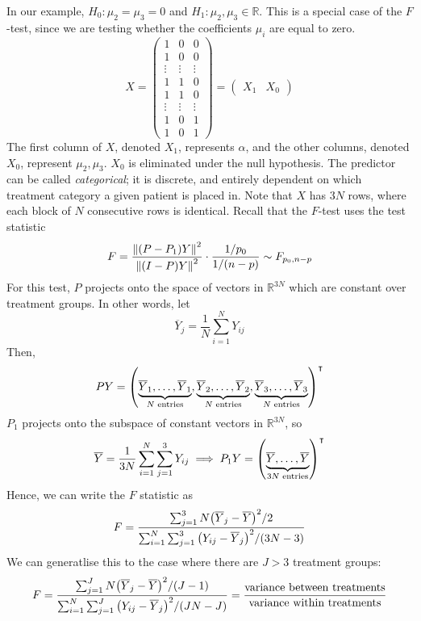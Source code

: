 In our example, \( H_0 \colon \mu_2 = \mu_3 = 0 \) and \( H_1 \colon \mu_2, \mu_3 \in \mathbb R \).
This is a special case of the \( F \)-test, since we are testing whether the coefficients \( \mu_i \) are equal to zero.
\[
	X = \begin{pmatrix}
		1      & 0      & 0      \\
		1      & 0      & 0      \\
		\vdots & \vdots & \vdots \\
		1      & 1      & 0      \\
		1      & 1      & 0      \\
		\vdots & \vdots & \vdots \\
		1      & 0      & 1      \\
		1      & 0      & 1
	\end{pmatrix} = \begin{pmatrix}
		X_1 & X_0
	\end{pmatrix}
\]
The first column of \( X \), denoted \( X_1 \), represents \( \alpha \), and the other columns, denoted \( X_0 \), represent \( \mu_2, \mu_3 \).
\( X_0 \) is eliminated under the null hypothesis.
The predictor can be called \textit{categorical}; it is discrete, and entirely dependent on which treatment category a given patient is placed in.
Note that \( X \) has \( 3N \) rows, where each block of \( N \) consecutive rows is identical.
Recall that the \( F \)-test uses the test statistic
\[
	F = \frac{\norm{(P-P_1)Y}^2}{\norm{(I-P)Y}^2} \cdot \frac{1/p_0}{1/(n-p)} \sim F_{p_0,n-p}
\]
For this test, \( P \) projects onto the space of vectors in \( \mathbb R^{3N} \) which are constant over treatment groups.
In other words, let
\[
	\overline Y_j = \frac{1}{N} \sum_{i=1}^N Y_{ij}
\]
Then,
\[
	P Y = \qty( \underbrace{\overline Y_1, \dots, \overline Y_1}_{N \text{ entries}}, \underbrace{\overline Y_2, \dots, \overline Y_2}_{N \text{ entries}}, \underbrace{\overline Y_3, \dots, \overline Y_3}_{N \text{ entries}} )^\intercal
\]
\( P_1 \) projects onto the subspace of constant vectors in \( \mathbb R^{3N} \), so
\[
	\overline Y = \frac{1}{3N} \sum_{i=1}^N \sum_{j=1}^3 Y_{ij} \implies P_1 Y = \qty( \underbrace{\overline Y, \dots, \overline Y}_{3N \text{ entries}} )^\intercal
\]
Hence, we can write the \( F \) statistic as
\[
	F = \frac{\sum_{j=1}^3 N \qty(\overline Y_j - \overline Y)^2 / 2}{\sum_{i=1}^N \sum_{j=1}^3 \qty(Y_{ij} - \overline Y_j)^2 / (3N-3)}
\]
We can generatlise this to the case where there are \( J > 3 \) treatment groups:
\[
	F = \frac{\sum_{j=1}^J N \qty(\overline Y_j - \overline Y)^2 / (J-1)}{\sum_{i=1}^N \sum_{j=1}^J \qty(Y_{ij} - \overline Y_j)^2 / (JN-J)} = \frac{\text{variance between treatments}}{\text{variance within treatments}}
\]
